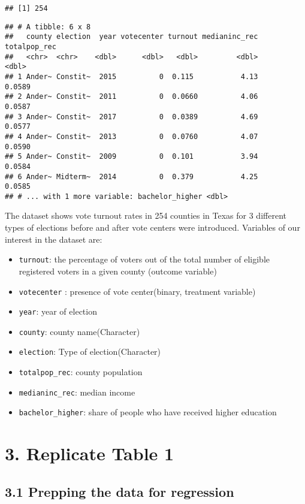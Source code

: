 \documentclass[
]{article}
\providecommand{\tightlist}{%
  \setlength{\itemsep}{0pt}\setlength{\parskip}{0pt}}
\begin{document}
\begin{verbatim}
## [1] 254
\end{verbatim}

\begin{verbatim}
## # A tibble: 6 x 8
##   county election  year votecenter turnout medianinc_rec totalpop_rec
##   <chr>  <chr>    <dbl>      <dbl>   <dbl>         <dbl>        <dbl>
## 1 Ander~ Constit~  2015          0  0.115           4.13       0.0589
## 2 Ander~ Constit~  2011          0  0.0660          4.06       0.0587
## 3 Ander~ Constit~  2017          0  0.0389          4.69       0.0577
## 4 Ander~ Constit~  2013          0  0.0760          4.07       0.0590
## 5 Ander~ Constit~  2009          0  0.101           3.94       0.0584
## 6 Ander~ Midterm~  2014          0  0.379           4.25       0.0585
## # ... with 1 more variable: bachelor_higher <dbl>
\end{verbatim}

The dataset shows vote turnout rates in 254 counties in Texas for 3
different types of elections before and after vote centers were
introduced. Variables of our interest in the dataset are:

\begin{itemize}
\tightlist
\item
  \texttt{turnout}: the percentage of voters out of the total number of
  eligible registered voters in a given county (outcome variable)
\item
  \texttt{votecenter} : presence of vote center(binary, treatment
  variable)
\item
  \texttt{year}: year of election
\item
  \texttt{county}: county name(Character)
\item
  \texttt{election}: Type of election(Character)
\item
  \texttt{totalpop\_rec}: county population
\item
  \texttt{medianinc\_rec}: median income
\item
  \texttt{bachelor\_higher}: share of people who have received higher
  education
\end{itemize}

\hypertarget{replicate-table-1}{%
\section{3. Replicate Table 1}\label{replicate-table-1}}

\hypertarget{prepping-the-data-for-regression}{%
\subsection{3.1 Prepping the data for
regression}\label{prepping-the-data-for-regression}}
\end{document}
